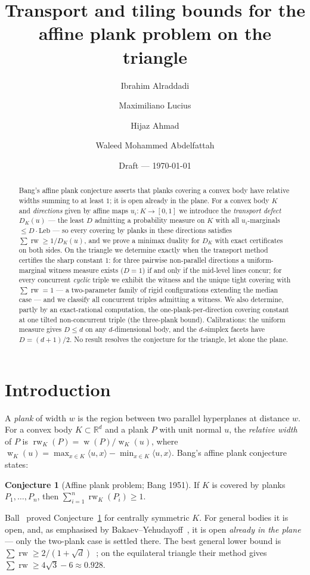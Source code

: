 \documentclass[11pt,reqno]{amsart}
\title{Transport and tiling bounds for the affine plank problem on the triangle}
\author{Ibrahim Alraddadi}
\author{Maximiliano Lucius}
\author{Hijaz Ahmad}
\author{Waleed Mohammed Abdelfattah}
\date{Draft --- \today}
\theoremstyle{plain}
\theoremstyle{definition}
\newtheorem{conjecture}[theorem]{Conjecture}
\theoremstyle{remark}
\newcommand{\rw}{\operatorname{rw}}
\newcommand{\R}{\mathbb{R}}
\DeclareMathOperator{\wid}{w}
\begin{document}
\begin{abstract}
Bang's affine plank conjecture asserts that planks covering a convex body have
relative widths summing to at least $1$; it is open already in the plane. For a
convex body $K$ and \emph{directions} given by affine maps $u_i:K\to[0,1]$ we
introduce the \emph{transport defect} $D_K(u)$ --- the least $D$ admitting a
probability measure on $K$ with all $u_i$-marginals $\le D\cdot\mathrm{Leb}$
--- so every covering by planks in these directions satisfies
$\sum\rw\ge1/D_K(u)$, and we prove a minimax duality for $D_K$ with exact
certificates on both sides. On the triangle we determine exactly when the
transport method certifies the sharp constant $1$: for three pairwise
non-parallel directions a uniform-marginal witness measure exists ($D=1$) if
and only if the mid-level lines concur; for every concurrent \emph{cyclic}
triple we exhibit the witness and the unique tight covering with $\sum\rw=1$
--- a two-parameter family of rigid configurations extending the median case
--- and we classify all concurrent triples admitting a witness. We also
determine, partly by an exact-rational computation, the one-plank-per-direction
covering constant at one tilted non-concurrent triple (the three-plank bound).
Calibrations: the uniform measure gives $D\le d$ on any $d$-dimensional body,
and the $d$-simplex facets have $D=(d+1)/2$. No result resolves the conjecture
for the triangle, let alone the plane.
\end{abstract}
\maketitle

\section{Introduction}\label{sec:intro}

A \emph{plank} of width $w$ is the region between two parallel hyperplanes at
distance $w$. For a convex body $K\subset\R^d$ and a plank $P$ with unit normal $u$,
the \emph{relative width} of $P$ is $\rw_K(P)=\wid(P)/\wid_K(u)$, where
$\wid_K(u)=\max_{x\in K}\langle u,x\rangle-\min_{x\in K}\langle u,x\rangle$. Bang's
affine plank conjecture~\cite{Bang51,Ambrus} states:
\begin{conjecture}[Affine plank problem; Bang 1951]\label{conj:bang}
If $K$ is covered by planks $P_1,\dots,P_n$, then $\sum_{i=1}^n \rw_K(P_i)\ge 1$.
\end{conjecture}
Ball~\cite{Ball91} proved Conjecture~\ref{conj:bang} for centrally symmetric $K$.
For general bodies it is open, and, as emphasised by Bakaev--Yehudayoff~\cite{BY26},
it is open \emph{already in the plane} --- only the two-plank case is settled there.
The best general lower bound is
$\sum\rw\ge 2/(1+\sqrt d)$~\cite{BY26}; on the equilateral triangle their method
gives $\sum\rw\ge 4\sqrt3-6\approx0.928$.
\end{document}
